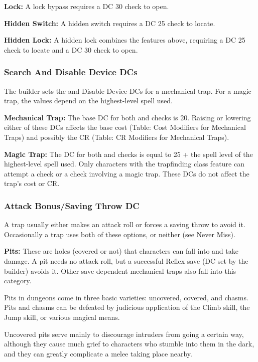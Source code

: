 \textbf{Lock:} A lock bypass requires a DC 30  check to open.

\textbf{Hidden Switch:} A hidden switch requires a DC 25  check to locate.

\textbf{Hidden Lock:} A hidden lock combines the features above, requiring a DC 25  check to locate and a DC 30  check to open.

\subsubsection{Search And Disable Device DCs}
The builder sets the  and Disable Device DCs for a mechanical trap. For a magic trap, the values depend on the highest-level spell used.

\textbf{Mechanical Trap:} The base DC for both  and  checks is 20. Raising or lowering either of these DCs affects the base cost (Table: Cost Modifiers for Mechanical Traps) and possibly the CR (Table: CR Modifiers for Mechanical Traps).

\textbf{Magic Trap:} The DC for both  and  checks is equal to 25 + the spell level of the highest-level spell used. Only characters with the trapfinding class feature can attempt a  check or a  check involving a magic trap. These DCs do not affect the trap’s cost or CR.

\subsubsection{Attack Bonus/Saving Throw DC}
A trap usually either makes an attack roll or forces a saving throw to avoid it. Occasionally a trap uses both of these options, or neither (see Never Miss).

\textbf{Pits:} These are holes (covered or not) that characters can fall into and take damage. A pit needs no attack roll, but a successful Reflex save (DC set by the builder) avoids it. Other save-dependent mechanical traps also fall into this category.

Pits in dungeons come in three basic varieties: uncovered, covered, and chasms. Pits and chasms can be defeated by judicious application of the Climb skill, the Jump skill, or various magical means.

Uncovered pits serve mainly to discourage intruders from going a certain way, although they cause much grief to characters who stumble into them in the dark, and they can greatly complicate a melee taking place nearby.

